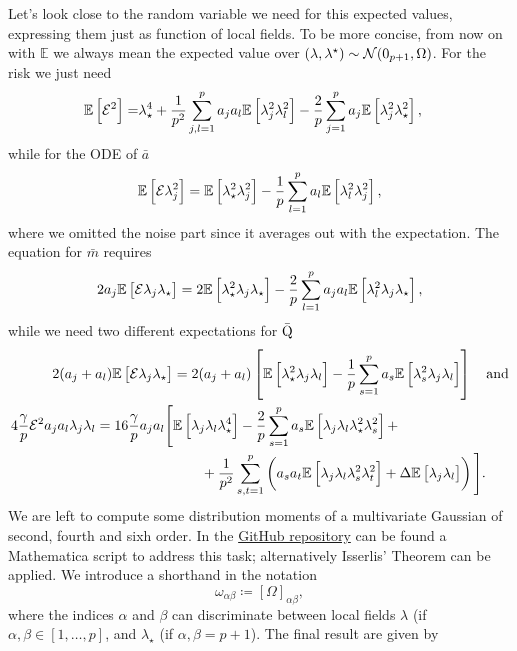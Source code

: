 Let's look close to the random variable we need for this expected values, expressing them just as function of local fields.
To be more concise, from now on with \(\mathbb E\) we always mean the expected value over \((\lambda,\lambda^{\star})\sim\mathcal{N}(0_{p+1}, \Omega)\).
For the risk we just need
\[\begin{split}
  \mathbb{E}\left[\mathcal{E}^2\right] =& \lambda_\star^4 + \frac{1}{p^2} \sum_{j, l =1}^p a_j a_l\mathbb{E}\left[\lambda_j^2 \lambda_l^2\right] - \frac{2}{p} \sum_{j=1}^p a_j\mathbb{E}\left[\lambda_j^2 \lambda_\star^2\right],
\end{split}\]
while for the ODE of \(\bar{a}\) 
\[\begin{split}
    \mathbb{E}\left[\mathcal{E} \lambda_j^2\right] = \mathbb{E}\left[\lambda_{\star}^2\lambda_j^2\right] - \frac{1}{p}\sum_{l=1}^{p}a_{l}\mathbb{E}\left[\lambda_{l}^2\lambda_j^2\right],
\end{split}\]
where we omitted the noise part since it averages out with the expectation.
The equation for \(\bar{m}\) requires 
\[\begin{split}
    2a_j\mathbb{E}\left[\mathcal{E} \lambda_j\lambda_\star\right] = 2\mathbb{E}\left[\lambda_{\star}^2\lambda_j\lambda_\star\right] - \frac{2}{p}\sum_{l=1}^{p}a_j a_{l}\mathbb{E}\left[\lambda_{l}^2\lambda_j\lambda_\star\right],
\end{split}\]
while we need two different expectations for \(\bar{\mathrm{Q}}\)
\[\begin{split}
    2(a_j+a_l)\mathbb{E}\left[\mathcal{E} \lambda_j\lambda_\star\right] &= 2(a_j+a_l)\left[\mathbb{E}\left[\lambda_{\star}^2\lambda_j\lambda_l\right] - \frac{1}{p}\sum_{s=1}^{p}a_s\mathbb{E}\left[\lambda_{s}^2\lambda_j\lambda_l\right]\right] \quad\text{and} \\
    4\frac{\gamma}{p}{\mathcal{E}}^{2} a_{j}a_{l}\lambda_{j}\lambda_{l}  = 16\frac{\gamma}{p} a_{j}a_{l} \Bigg[ 
        &  \mathbb{E}\left[\lambda_j \lambda_l\lambda_\star^4\right]  - \frac{2}{p} \sum_{s =1}^{p} a_s \mathbb{E}\left[\lambda_j \lambda_l \lambda_\star^2 \lambda_s^2\right] +\\
           &\qquad+ \frac{1}{p^2} \sum_{ s,  t =1}^{p}\left(a_sa_t\mathbb{E}\left[\lambda_j \lambda_l \lambda_s^2 \lambda_t^2\right]+\Delta\mathbb{E}\left[\lambda_j \lambda_l\right]\right) \Bigg].
\end{split}\]
We are left to compute some distribution moments of a multivariate Gaussian of second, fourth and sixh order.
In the \href{https://github.com/IdePHICS/EscapingMediocrity}{GitHub repository} can be found a Mathematica script to address this task;
alternatively Isserlis' Theorem can be applied.
We introduce a shorthand in the notation \[\omega_{\alpha\beta} \coloneqq \left[{\Omega}\right]_{\alpha\beta},\]
where the indices \(\alpha\) and \(\beta\) can discriminate between local fields \(\lambda\) (if \(\alpha,\beta \in [1,\dots,p]\), and \(\lambda_\star\) (if  \(\alpha,\beta = p+1\)). The final result are given by
